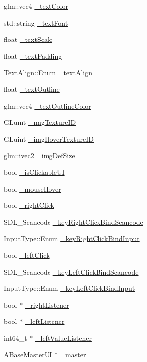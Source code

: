 \begin{DoxyCompactItemize}
\item 
glm\+::vec4 \hyperlink{class_a_base_u_i_adf4fa1adf7b9ad2caa1e12b35faa8d43}{\+\_\+text\+Color}
\item 
std\+::string \hyperlink{class_a_base_u_i_a14dff508ca40dac0ee7c1b6971f77ffa}{\+\_\+text\+Font}
\item 
float \hyperlink{class_a_base_u_i_a4424a672c8f3692ef6406153cedd586d}{\+\_\+text\+Scale}
\item 
float \hyperlink{class_a_base_u_i_a671ff5cf527f5bd46c53aec1e5bf7587}{\+\_\+text\+Padding}
\item 
Text\+Align\+::\+Enum \hyperlink{class_a_base_u_i_a13286189be7e92f8a16e4b386cc55a12}{\+\_\+text\+Align}
\item 
float \hyperlink{class_a_base_u_i_af589bc6edf0de106d0086bb90f979a03}{\+\_\+text\+Outline}
\item 
glm\+::vec4 \hyperlink{class_a_base_u_i_a774176996863d33eafee46189f4c6674}{\+\_\+text\+Outline\+Color}
\item 
G\+Luint \hyperlink{class_a_base_u_i_ab49062eddc5e65d0b0492dff5f9ab68c}{\+\_\+img\+Texture\+ID}
\item 
G\+Luint \hyperlink{class_a_base_u_i_a9507b571165a3ec451996c0ec480e64e}{\+\_\+img\+Hover\+Texture\+ID}
\item 
glm\+::ivec2 \hyperlink{class_a_base_u_i_a14a4484bb3b54794bde4739f8e4ac54e}{\+\_\+img\+Def\+Size}
\item 
bool \hyperlink{class_a_base_u_i_a3aaafd7bbc571b530af4b1307240e578}{\+\_\+is\+Clickable\+UI}
\item 
bool \hyperlink{class_a_base_u_i_a66b70cd45cd3e8daa6c877c728fc61c5}{\+\_\+mouse\+Hover}
\item 
bool \hyperlink{class_a_base_u_i_a58f9a340b77a03c84b1394a8c0bca1b9}{\+\_\+right\+Click}
\item 
S\+D\+L\+\_\+\+Scancode \hyperlink{class_a_base_u_i_a378aface650a88817661939f7e5ce8ff}{\+\_\+key\+Right\+Click\+Bind\+Scancode}
\item 
Input\+Type\+::\+Enum \hyperlink{class_a_base_u_i_a41d363ac36296d11ccb3f1ce29ea2f65}{\+\_\+key\+Right\+Click\+Bind\+Input}
\item 
bool \hyperlink{class_a_base_u_i_a1da64e5630b8304490281f98d3b070b9}{\+\_\+left\+Click}
\item 
S\+D\+L\+\_\+\+Scancode \hyperlink{class_a_base_u_i_a823b13eedc079d67bd45e6f6ccfc2572}{\+\_\+key\+Left\+Click\+Bind\+Scancode}
\item 
Input\+Type\+::\+Enum \hyperlink{class_a_base_u_i_a0639ff21c455115a6f1b49c03af3e48c}{\+\_\+key\+Left\+Click\+Bind\+Input}
\item 
bool $\ast$ \hyperlink{class_a_base_u_i_a4656f0b7d85d6ed7911ab8d97363e6e3}{\+\_\+right\+Listener}
\item 
bool $\ast$ \hyperlink{class_a_base_u_i_a53f3f04ee2ed7efb056d120e7d251678}{\+\_\+left\+Listener}
\item 
int64\+\_\+t $\ast$ \hyperlink{class_a_base_u_i_a6ea8c5e21ed3cc9b6b3cce40ebad94a2}{\+\_\+left\+Value\+Listener}
\item 
\hyperlink{class_a_base_master_u_i}{A\+Base\+Master\+UI} $\ast$ \hyperlink{class_a_base_u_i_abad08db5a70df2402e8c4e2c01f98854}{\+\_\+master}
\end{DoxyCompactItemize}
